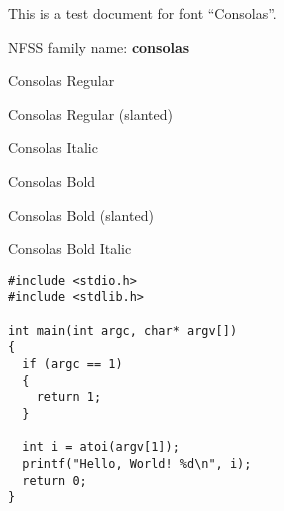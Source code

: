 \documentclass{jsarticle}
\begin{document}
{This is a test document for font ``Consolas''.}

NFSS family name: {\bfseries consolas}

{\selectfont Consolas Regular}\par
{\selectfont Consolas Regular (slanted)}\par
{\selectfont Consolas Italic}\par
{\selectfont Consolas Bold}\par
{\selectfont Consolas Bold (slanted)}\par
{\selectfont Consolas Bold Italic}\par

\renewcommand{\ttdefault}{consolas}

\begin{verbatim}
#include <stdio.h>
#include <stdlib.h>

int main(int argc, char* argv[])
{
  if (argc == 1)
  {
    return 1;
  }

  int i = atoi(argv[1]);
  printf("Hello, World! %d\n", i);
  return 0;
}
\end{verbatim}
\end{document}
